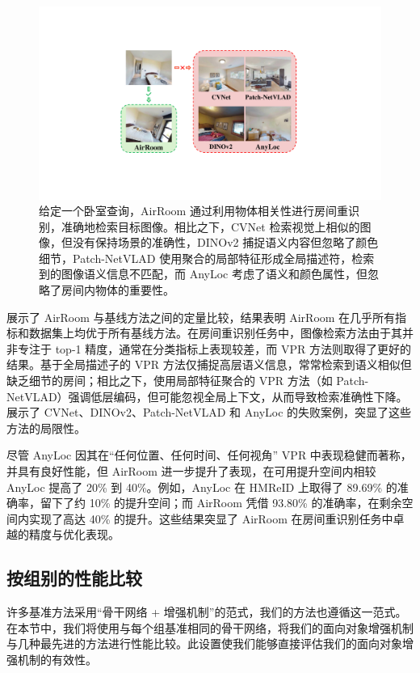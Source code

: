 \begin{figure}[ht]
    \centering
    \includegraphics[width=\columnwidth]{failure_font.pdf}
    \vspace{-16pt}
    \caption{给定一个卧室查询，AirRoom 通过利用物体相关性进行房间重识别，准确地检索目标图像。相比之下，CVNet 检索视觉上相似的图像，但没有保持场景的准确性，DINOv2 捕捉语义内容但忽略了颜色细节，Patch-NetVLAD 使用聚合的局部特征形成全局描述符，检索到的图像语义信息不匹配，而 AnyLoc 考虑了语义和颜色属性，但忽略了房间内物体的重要性。}
    \vspace{-5pt}
    \label{fig:failure}
\end{figure}

 展示了 AirRoom 与基线方法之间的定量比较，结果表明 AirRoom 在几乎所有指标和数据集上均优于所有基线方法。在房间重识别任务中，图像检索方法由于其并非专注于 top-1 精度，通常在分类指标上表现较差，而 VPR 方法则取得了更好的结果。基于全局描述子的 VPR 方法仅捕捉高层语义信息，常常检索到语义相似但缺乏细节的房间；相比之下，使用局部特征聚合的 VPR 方法（如 Patch-NetVLAD）强调低层编码，但可能忽视全局上下文，从而导致检索准确性下降。  展示了 CVNet、DINOv2、Patch-NetVLAD 和 AnyLoc 的失败案例，突显了这些方法的局限性。

尽管 AnyLoc 因其在“任何位置、任何时间、任何视角” VPR 中表现稳健而著称，并具有良好性能，但 AirRoom 进一步提升了表现，在可用提升空间内相较 AnyLoc 提高了 20\% 到 40\%。例如，AnyLoc 在 HMReID 上取得了 89.69\% 的准确率，留下了约 10\% 的提升空间；而 AirRoom 凭借 93.80\% 的准确率，在剩余空间内实现了高达 40\% 的提升。这些结果突显了 AirRoom 在房间重识别任务中卓越的精度与优化表现。
\subsection{按组别的性能比较}
\label{sec:section4.5}
\vspace{-3pt}
许多基准方法采用“骨干网络 + 增强机制”的范式，我们的方法也遵循这一范式。在本节中，我们将使用与每个组基准相同的骨干网络，将我们的面向对象增强机制与几种最先进的方法进行性能比较。此设置使我们能够直接评估我们的面向对象增强机制的有效性。

